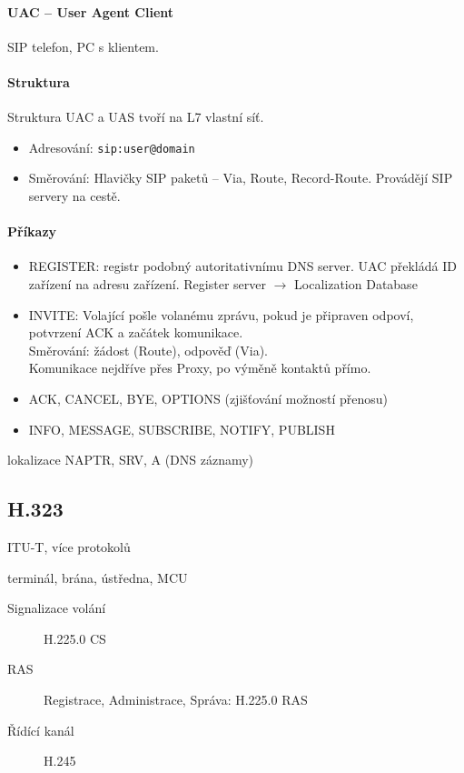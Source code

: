 \documentclass[a4paper, 11pt]{report}
\begin{document}
\paragraph{UAC -- User Agent Client}
SIP telefon, PC s klientem.

\paragraph{Struktura}
Struktura UAC a UAS tvoří na L7 vlastní síť.
\begin{itemize}
	\item Adresování: \verb|sip:user@domain|
	\item Směrování: Hlavičky SIP paketů -- Via, Route, Record-Route. Provádějí SIP servery na cestě.
\end{itemize}

\paragraph{Příkazy}
\begin{itemize}
	\item REGISTER: registr podobný autoritativnímu DNS server. UAC překládá ID zařízení na adresu zařízení. Register server $\to$ Localization Database
	\item INVITE: Volající pošle volanému zprávu, pokud je připraven odpoví, potvrzení ACK a začátek komunikace.\\
		Směrování: žádost (Route), odpověď (Via).\\
		Komunikace nejdříve přes Proxy, po výměně kontaktů přímo.
	\item ACK, CANCEL, BYE, OPTIONS (zjišťování možností přenosu)
	\item INFO, MESSAGE, SUBSCRIBE, NOTIFY, PUBLISH
\end{itemize}

lokalizace NAPTR, SRV, A (DNS záznamy)

\subsection{H.323}
ITU-T, více protokolů

terminál, brána, ústředna, MCU

\begin{description}
	\item[Signalizace volání] H.225.0 CS
	\item[RAS] Registrace, Administrace, Správa: H.225.0 RAS
	\item[Řídící kanál] H.245
\end{description}
\end{document}

